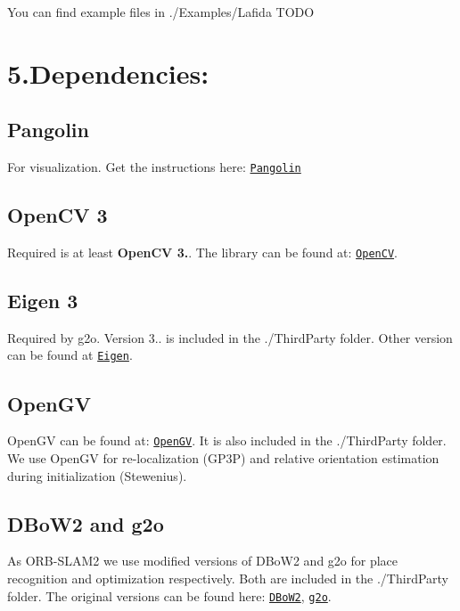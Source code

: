 You can find example files in ./\+Examples/\+Lafida T\+O\+DO

\section*{5.\+Dependencies\+:}

\subsection*{Pangolin}

For visualization. Get the instructions here\+: \href{https://github.com/stevenlovegrove/Pangolin}{\tt Pangolin}

\subsection*{Open\+CV 3}

Required is at least {\bfseries Open\+CV 3.}. The library can be found at\+: \href{https://github.com/opencv/opencv}{\tt Open\+CV}.

\subsection*{Eigen 3}

Required by g2o. Version 3.. is included in the ./\+Third\+Party folder. Other version can be found at \href{http://eigen.tuxfamily.org/index.php?title=Main_Page}{\tt Eigen}.

\subsection*{Open\+GV}

Open\+GV can be found at\+: \href{https://github.com/laurentkneip/opengv}{\tt Open\+GV}. It is also included in the ./\+Third\+Party folder. We use Open\+GV for re-\/localization (G\+P3P) and relative orientation estimation during initialization (Stewenius).

\subsection*{D\+Bo\+W2 and g2o}

As O\+R\+B-\/\+S\+L\+A\+M2 we use modified versions of D\+Bo\+W2 and g2o for place recognition and optimization respectively. Both are included in the ./\+Third\+Party folder. The original versions can be found here\+: \href{https://github.com/dorian3d/DBoW2}{\tt D\+Bo\+W2}, \href{https://github.com/RainerKuemmerle/g2o}{\tt g2o}.

